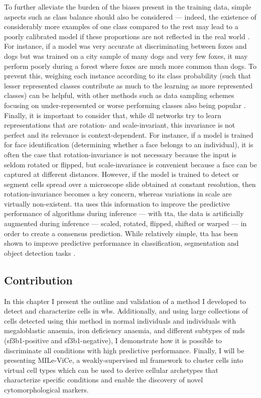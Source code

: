 To further alleviate the burden of the biases present in the training data, simple aspects such as class balance should also be considered --- indeed, the existence of considerably more examples of one class compared to the rest may lead to a poorly calibrated model if these proportions are not reflected in the real world \cite{Van_Calster2019-zp}. For instance, if a model was very accurate at discriminating between foxes and dogs but was trained on a city sample of many dogs and very few foxes, it may perform poorly during a forest where foxes are much more common than dogs. To prevent this, weighing each instance according to its class probability (such that lesser represented classes contribute as much to the learning as more represented classes) can be helpful, with other methods such as data sampling schemes focusing on under-represented or worse performing classes also being popular \cite{Johnson2019-cf}. Finally, it is important to consider that, while \ac{dl} networks try to learn representations that are rotation- and scale-invariant, this invariance is not perfect and its relevance is context-dependent. For instance, if a model is trained for face identification (determining whether a face belongs to an individual), it is often the case that rotation-invariance is not necessary because the input is seldom rotated or flipped, but scale-invariance is convenient because a face can be captured at different distances. However, if the model is trained to detect or segment cells spread over a microscope slide obtained at constant resolution, then rotation-invariance becomes a key concern, whereas variations in scale are virtually non-existent. \Ac{tta} uses this information to improve the predictive performance of algorithms during inference --- with \ac{tta}, the data is artificially augmented during inference --- scaled, rotated, flipped, shifted or warped --- in order to create a consensus prediction. While relatively simple, \ac{tta} has been shown to improve predictive performance in classification, segmentation and object detection tasks \cite{Moshkov2020-rc,Shorten2019-hr}.

\subsection{Contribution}

In this chapter I present the outline and validation of a method I developed to detect and characterize cells in \ac{wbs}. Additionally, and using large collections of cells detected using this method in normal individuals and individuals with megaloblastic anaemia, iron deficiency anaemia, and different subtypes of \ac{mds} (\ac{sf3b1}-positive and \ac{sf3b1}-negative), I demonstrate how it is possible to discriminate all conditions with high predictive performance. Finally, I will be presenting MILe-ViCe, a weakly-supervised \ac{ml} framework to cluster cells into virtual cell types which can be used to derive cellular archetypes that characterize specific conditions and enable the discovery of novel cytomorphological markers.

